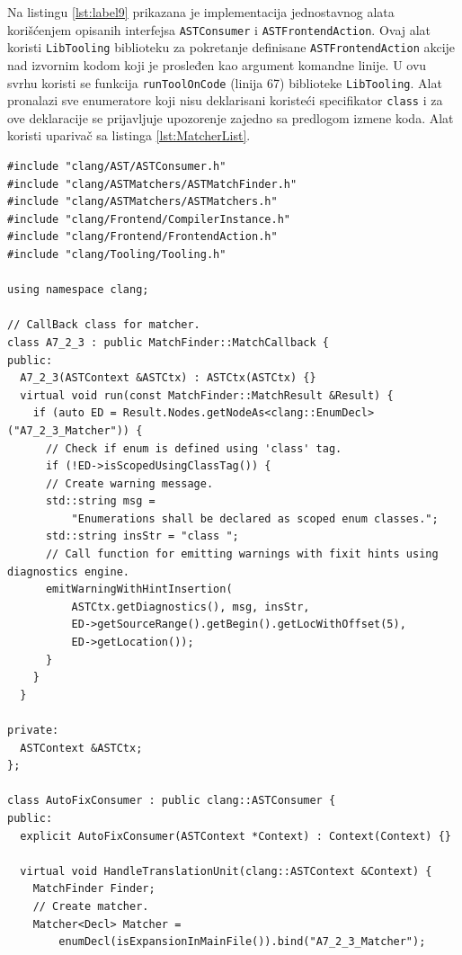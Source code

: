 \documentclass[12pt,oneside]{memoir}
\begin{document}
Na listingu \ref{lst:label9} prikazana je implementacija jednostavnog alata kori\v{s}\'{c}enjem opisanih interfejsa \texttt{ASTConsumer} i \texttt{ASTFrontendAction}. Ovaj alat koristi \texttt{LibTooling} biblioteku za pokretanje definisane \texttt{ASTFrontendAction} akcije nad izvornim kodom koji je prosleđen kao argument komandne linije. U ovu svrhu koristi se funkcija \texttt{runToolOnCode} (linija 67) biblioteke \texttt{LibTooling}. Alat pronalazi sve enumeratore koji nisu deklarisani koriste\'{c}i specifikator \texttt{class} i za ove deklaracije se prijavljuje upozorenje zajedno sa predlogom izmene koda. Alat koristi upariva\v{c} sa listinga \ref{lst:MatcherList}.
\\
\begin{lstlisting}[style=customc, basicstyle=\tiny, caption={Primer implementacije jednostavnog alata upotrebom interfejsa \texttt{ASTConsumer}, \texttt{ASTFrontendAction} i bibliotekom \texttt{libtooling}.}, label=lst:label9]
#include "clang/AST/ASTConsumer.h"
#include "clang/ASTMatchers/ASTMatchFinder.h"
#include "clang/ASTMatchers/ASTMatchers.h"
#include "clang/Frontend/CompilerInstance.h"
#include "clang/Frontend/FrontendAction.h"
#include "clang/Tooling/Tooling.h"

using namespace clang;

// CallBack class for matcher.
class A7_2_3 : public MatchFinder::MatchCallback {
public:
  A7_2_3(ASTContext &ASTCtx) : ASTCtx(ASTCtx) {}
  virtual void run(const MatchFinder::MatchResult &Result) {
    if (auto ED = Result.Nodes.getNodeAs<clang::EnumDecl>("A7_2_3_Matcher")) {
      // Check if enum is defined using 'class' tag.
      if (!ED->isScopedUsingClassTag()) {
      // Create warning message.
      std::string msg =
          "Enumerations shall be declared as scoped enum classes.";
      std::string insStr = "class ";
      // Call function for emitting warnings with fixit hints using diagnostics engine.
      emitWarningWithHintInsertion(
          ASTCtx.getDiagnostics(), msg, insStr,
          ED->getSourceRange().getBegin().getLocWithOffset(5),
          ED->getLocation());
      }
    }
  }

private:
  ASTContext &ASTCtx;
};

class AutoFixConsumer : public clang::ASTConsumer {
public:
  explicit AutoFixConsumer(ASTContext *Context) : Context(Context) {}

  virtual void HandleTranslationUnit(clang::ASTContext &Context) {
    MatchFinder Finder;
    // Create matcher.
    Matcher<Decl> Matcher =
        enumDecl(isExpansionInMainFile()).bind("A7_2_3_Matcher");


\end{lstlisting}
\end{document}

